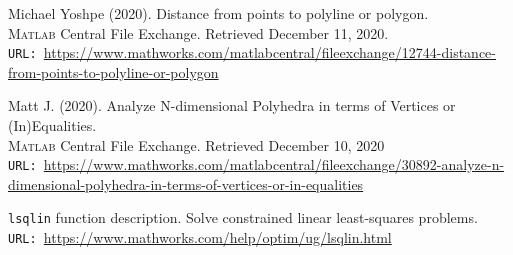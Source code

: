 \documentclass[12pt]{article}
\numberwithin{equation}{section}
\begin{document}
\begin{spacing}{1.5}
\begin{thebibliography}{8}
		Michael Yoshpe (2020). Distance from points to polyline or polygon. \\
		\textsc{Matlab} Central File Exchange. Retrieved December 11, 2020. \\ \texttt{URL: }\url{https://www.mathworks.com/matlabcentral/fileexchange/12744-distance-from-points-to-polyline-or-polygon}
		
		Matt J. (2020). Analyze N-dimensional Polyhedra in terms of Vertices or (In)Equalities. \\
		\textsc{Matlab} Central File Exchange. Retrieved December 10, 2020\\
		\texttt{URL: }\url{https://www.mathworks.com/matlabcentral/fileexchange/30892-analyze-n-dimensional-polyhedra-in-terms-of-vertices-or-in-equalities}
		
		\texttt{lsqlin} function description. Solve constrained linear least-squares problems. \\
		\texttt{URL: }\url{https://www.mathworks.com/help/optim/ug/lsqlin.html}
	\end{thebibliography}

	\end{spacing}
	
\end{document}
